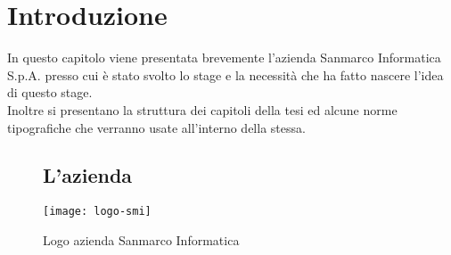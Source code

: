 
\chapter{Introduzione}
\label{cap:introduzione}

In questo capitolo viene presentata brevemente l'azienda Sanmarco Informatica S.p.A. presso cui è stato svolto lo stage e la necessità che ha fatto nascere l'idea di questo stage.\\
Inoltre si presentano la struttura dei capitoli della tesi ed alcune norme tipografiche che verranno usate all'interno della stessa. 





\begin{figure}[h!]

\section{L'azienda}
   \begin{center}
    \texttt{[image: logo-smi]}
    \caption{Logo azienda Sanmarco Informatica}
    \end{center}
     \end{figure}
     
  
    
